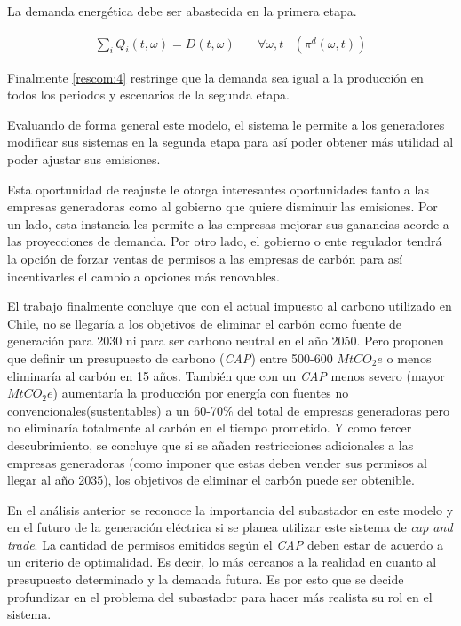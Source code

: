 La demanda energética debe ser abastecida en la primera etapa.

\begin{align}
    \sum_{i}Q_i(t,\omega) = D(t,\omega) \quad& \forall  \omega,t & (\pi^d (\omega,t))\label{rescom:4}
\end{align}

Finalmente \ref{rescom:4} restringe que la demanda sea igual a la producción en todos los periodos y escenarios de la segunda etapa.
\vspace{2.5mm}

Evaluando de forma general este modelo, el sistema le permite a los generadores modificar sus sistemas en la segunda etapa para así poder obtener más utilidad al poder ajustar sus emisiones.
\vspace{2.5mm}

Esta oportunidad de reajuste le otorga interesantes oportunidades tanto a las empresas generadoras como al gobierno que quiere disminuir las emisiones. Por un lado, esta instancia les permite a las empresas mejorar sus ganancias acorde a las proyecciones de demanda. Por otro lado, el gobierno o ente regulador tendrá la opción de forzar ventas de permisos a las empresas de carbón para así incentivarles el cambio a opciones más renovables. 
\vspace{2.5mm}

El trabajo finalmente concluye que con el actual impuesto al carbono utilizado en Chile, no se llegaría a los objetivos de eliminar el carbón como fuente de generación para 2030 ni para ser carbono neutral en el año 2050. Pero proponen que definir un presupuesto de carbono (\textit{CAP}) entre 500-600 $MtCO_2 e$ o menos eliminaría al carbón en 15 años. También que con un \textit{CAP} menos severo (mayor $MtCO_2 e$) aumentaría la producción por energía con fuentes no convencionales(sustentables) a un 60-70\% del total de empresas generadoras pero no eliminaría totalmente al carbón en el tiempo prometido. Y como tercer descubrimiento, se concluye que si se añaden restricciones adicionales a las empresas generadoras (como imponer que estas deben vender sus permisos al llegar al año 2035), los objetivos de eliminar el carbón puede ser obtenible.
\vspace{2.5mm}

En el análisis anterior se reconoce la importancia del subastador en este modelo y en el futuro de la generación eléctrica si se planea utilizar este sistema de \textit{cap and trade}. La cantidad de permisos emitidos según el \textit{CAP} deben estar de acuerdo a un criterio de optimalidad. Es decir, lo más cercanos a la realidad en cuanto al presupuesto determinado y la demanda futura. Es por esto que se decide profundizar en el problema del subastador para hacer más realista su rol en el sistema.
\vspace{2.5mm}

